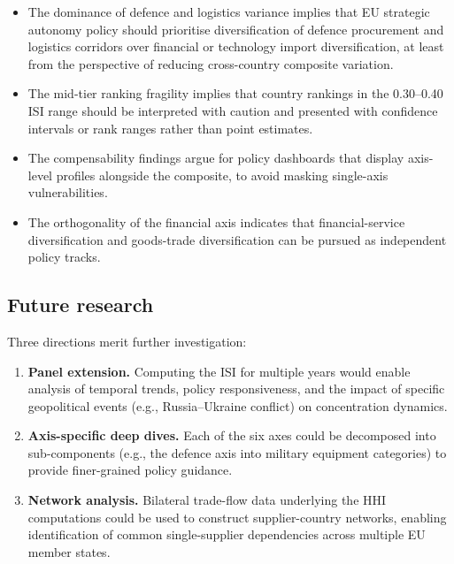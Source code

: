 \begin{itemize}[leftmargin=2em]
  \item The dominance of defence and logistics variance implies that
    EU strategic autonomy policy should prioritise diversification of
    defence procurement and logistics corridors over financial or
    technology import diversification, at least from the perspective
    of reducing cross-country composite variation.

  \item The mid-tier ranking fragility implies that country rankings
    in the 0.30--0.40 ISI range should be interpreted with caution
    and presented with confidence intervals or rank ranges rather than
    point estimates.

  \item The compensability findings argue for policy dashboards that
    display axis-level profiles alongside the composite, to avoid
    masking single-axis vulnerabilities.

  \item The orthogonality of the financial axis indicates that
    financial-service diversification and goods-trade diversification
    can be pursued as independent policy tracks.
\end{itemize}

\subsection{Future research}

Three directions merit further investigation:
\begin{enumerate}[leftmargin=2em]
  \item \textbf{Panel extension.}  Computing the ISI for multiple
    years would enable analysis of temporal trends, policy
    responsiveness, and the impact of specific geopolitical events
    (e.g., Russia--Ukraine conflict) on concentration dynamics.

  \item \textbf{Axis-specific deep dives.}  Each of the six axes
    could be decomposed into sub-components (e.g., the defence axis
    into military equipment categories) to provide finer-grained
    policy guidance.

  \item \textbf{Network analysis.}  Bilateral trade-flow data
    underlying the HHI computations could be used to construct
    supplier-country networks, enabling identification of common
    single-supplier dependencies across multiple EU member states.
\end{enumerate}
